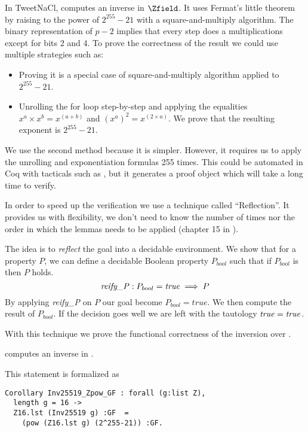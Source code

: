 In TweetNaCl,  computes an inverse in $\Zfield$.
It uses Fermat's little theorem by raising to the power of $2^{255}-21$ with a
square-and-multiply algorithm. The binary representation
of $p-2$ implies that every step does a multiplications except for bits 2 and 4.
To prove the correctness of the result we could use multiple strategies such as:
\begin{itemize}
  \item Proving it is a special case of square-and-multiply algorithm applied to $2^{255}-21$.
  \item Unrolling the for loop step-by-step and applying the equalities
  $x^a \times x^b = x^{(a+b)}$ and $(x^a)^2 = x^{(2 \times a)}$. We prove that
  the resulting exponent is $2^{255}-21$.
\end{itemize}
We use the second method because it is simpler. However, it requires us to
apply the unrolling and exponentiation formulas 255 times. This could be automated
in Coq with tacticals such as , but it generates a proof object which
will take a long time to verify.

In order to speed up the verification we use a
technique called ``Reflection''. It provides us with flexibility, \eg we don't
need to know the number of times nor the order in which the lemmas needs to be
applied (chapter 15 in \cite{CpdtJFR}).

The idea is to \emph{reflect} the goal into a decidable environment.
We show that for a property $P$, we can define a decidable Boolean property
$P_{bool}$ such that if $P_{bool}$ is  then $P$ holds.
$$\text{\textit{reify\_P}} : P_{bool} = \text{\textit{true}} \implies P$$
By applying \textit{reify\_P} on $P$ our goal become $P_{bool} = true$.
We then compute the result of $P_{bool}$. If the decision goes well we are
left with the tautology $\text{\textit{true}} = \text{\textit{true}}$.

With this technique we prove the functional correctness of the inversion over \Zfield.
\begin{lemma}
\label{cor:inv_comput_field}
 computes an inverse in \Zfield.
\end{lemma}
This statement is formalized as
\begin{lstlisting}[language=Coq]
Corollary Inv25519_Zpow_GF : forall (g:list Z),
  length g = 16 ->
  Z16.lst (Inv25519 g) :GF  =
    (pow (Z16.lst g) (2^255-21)) :GF.
\end{lstlisting}

